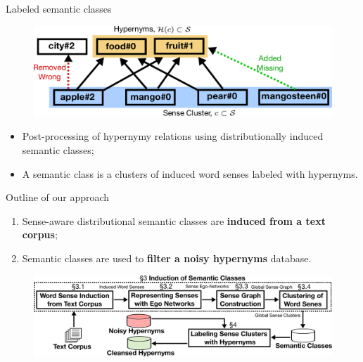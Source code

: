 \documentclass[usenames,dvipsnames]{beamer}
\begin{document}
\begin{frame}{ Labeled semantic classes}

\begin{figure}[ht]
  \centering
  \includegraphics[width=.99\textwidth]{figures/coset}

\end{figure}

\begin{itemize}
\item \alert{Post-processing of hypernymy relations} using distributionally induced semantic classes;
\item A semantic class is a clusters of induced word senses \alert{labeled with hypernyms}.

\end{itemize}



\end{frame}


\begin{frame}{Outline of our approach}



\begin{enumerate}
	\item Sense-aware distributional semantic classes are \textbf{induced from a text corpus}; 
	\item Semantic classes are used to \textbf{filter a noisy hypernyms} database. 
 
\end{enumerate}

\pause 


\begin{figure}
  \centering
  \includegraphics[width=.99\textwidth]{figures/outline}
  \end{figure}



\end{frame}
\end{document}

